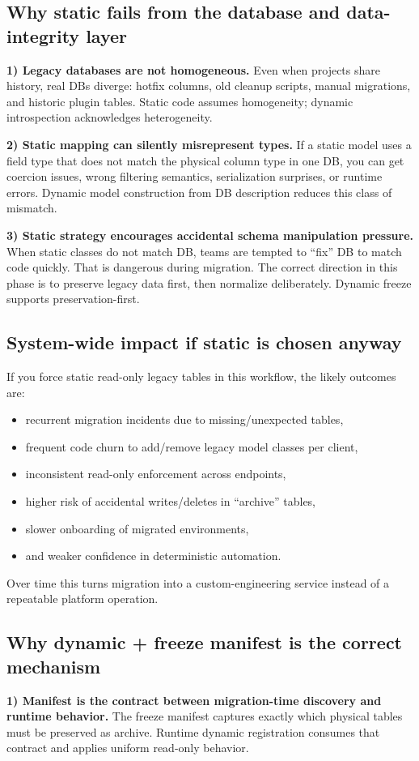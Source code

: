 \documentclass[11pt,a4paper]{article}
\begin{document}
\subsection*{Why static fails from the database and data-integrity layer}
\textbf{1) Legacy databases are not homogeneous.}
Even when projects share history, real DBs diverge: hotfix columns, old cleanup scripts,
manual migrations, and historic plugin tables. Static code assumes homogeneity; dynamic
introspection acknowledges heterogeneity.

\textbf{2) Static mapping can silently misrepresent types.}
If a static model uses a field type that does not match the physical column type in one DB,
you can get coercion issues, wrong filtering semantics, serialization surprises, or runtime
errors. Dynamic model construction from DB description reduces this class of mismatch.

\textbf{3) Static strategy encourages accidental schema manipulation pressure.}
When static classes do not match DB, teams are tempted to ``fix'' DB to match code quickly.
That is dangerous during migration. The correct direction in this phase is to preserve
legacy data first, then normalize deliberately. Dynamic freeze supports preservation-first.

\subsection*{System-wide impact if static is chosen anyway}
If you force static read-only legacy tables in this workflow, the likely outcomes are:
\begin{itemize}[leftmargin=1.5em]
  \item recurrent migration incidents due to missing/unexpected tables,
  \item frequent code churn to add/remove legacy model classes per client,
  \item inconsistent read-only enforcement across endpoints,
  \item higher risk of accidental writes/deletes in ``archive'' tables,
  \item slower onboarding of migrated environments,
  \item and weaker confidence in deterministic automation.
\end{itemize}
Over time this turns migration into a custom-engineering service instead of a repeatable
platform operation.

\subsection*{Why dynamic + freeze manifest is the correct mechanism}
\textbf{1) Manifest is the contract between migration-time discovery and runtime behavior.}
The freeze manifest captures exactly which physical tables must be preserved as archive.
Runtime dynamic registration consumes that contract and applies uniform read-only behavior.
\end{document}
